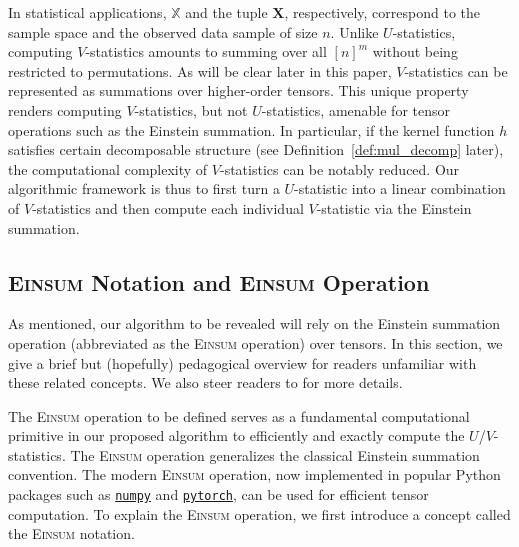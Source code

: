 \documentclass[sn-mathphys, natbib=false]{sn-jnl}
\newcommand{\libref}[2]{\href{#2}{\texttt{#1}}}
\theoremstyle{plain}
\theoremstyle{definition}
\def\Einsum{\textsc{Einsum}}
\newcommand{\numpy}{\libref{numpy}{https://numpy.org/}}
\newcommand{\torch}{\libref{pytorch}{https://pytorch.org/}}
\def\bbX{\mathbb{X}}
\begin{document}
\begin{bibunit}[agsm]
In statistical applications, $\bbX$ and the tuple $\bm{X}$, respectively, correspond to the sample space and the observed data sample of size $n$. Unlike $U$-statistics, computing $V$-statistics amounts to summing over all $[n]^{m}$ without being restricted to permutations. As will be clear later in this paper, $V$-statistics can be represented as summations over higher-order tensors. This unique property renders computing $V$-statistics, but not $U$-statistics, amenable for tensor operations such as the Einstein summation. In particular, if the kernel function $h$ satisfies certain decomposable structure (see Definition~\ref{def:mul_decomp} later), the computational complexity of $V$-statistics can be notably reduced. Our algorithmic framework is thus to first turn a $U$-statistic into a linear combination of $V$-statistics and then compute each individual $V$-statistic via the Einstein summation.

\subsection{\Einsum{} Notation and \Einsum{} Operation}
\label{sec:pre_tensor_contraction}

As mentioned, our algorithm to be revealed will rely on the Einstein summation operation (abbreviated as the \Einsum{} operation) over tensors. In this section, we give a brief but (hopefully) pedagogical overview for readers unfamiliar with these related concepts. We also steer readers to \citet{blacher2024einsum} for more details. 

The \Einsum{} operation to be defined serves as a fundamental computational primitive in our proposed algorithm to efficiently and exactly compute the $U$/$V$-statistics. The \Einsum{} operation generalizes the classical Einstein summation convention. The modern \Einsum{} operation, now implemented in popular Python packages such as \numpy{} and \torch{}, can be used for efficient tensor computation. To explain the \Einsum{} operation, we first introduce a concept called the \Einsum{} notation.


\end{bibunit}
\end{document}
